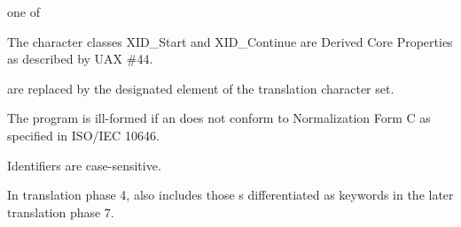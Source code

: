 \documentclass{wg21}
\begin{document}
\begin{bnf}
     \textnormal{one of}\br
\end{bnf}

\pnum
{}%
%
The character classes XID_Start and XID_Continue
are Derived Core Properties as described by UAX \#44.

\begin{addedblock}
 are replaced by the designated element of the translation character set.

\end{addedblock}

The program is ill-formed
if an  does not conform to
Normalization Form C as specified in ISO/IEC 10646.
\begin{note}
    Identifiers are case-sensitive.
\end{note}
\begin{note}
    In translation phase 4,
     also includes
    those s
    differentiated as keywords
    in the later translation phase 7.
\end{note}
\end{document}
